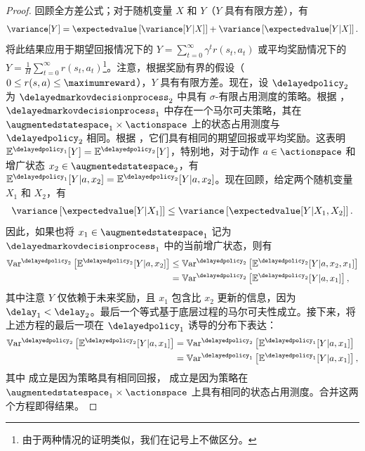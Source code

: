 \begin{proof}
    回顾全方差公式；对于随机变量 $X$ 和 $Y$（$Y$ 具有有限方差），有
    \begin{align*}
        \variance[Y] = \expectedvalue\left[\variance[Y\vert X]\right] + \variance\left[\expectedvalue[Y\vert X]\right].
    \end{align*}
    将此结果应用于期望回报情况下的 $\textstyle Y=\sum_{t=0}^\infty \gamma^{t} r(s_{t},a_{t})$ 或平均奖励情况下的 $\textstyle Y=\frac{1}{H}\sum_{t=0}^\infty r(s_{t},a_{t})$\footnote{由于两种情况的证明类似，我们在记号上不做区分。}。注意，根据奖励有界的假设（$0\le r(s,a)\le \maximumreward$），$Y$ 具有有限方差。现在，设 $\delayedpolicy_2$ 为 $\delayedmarkovdecisionprocess_{2}$ 中具有 $\sigma$-有限占用测度的策略。根据 ，$\delayedmarkovdecisionprocess_{1}$ 中存在一个马尔可夫策略，其在 $\augmentedstatespace_1\times\actionspace$ 上的状态占用测度与 $\delayedpolicy_2$ 相同。根据 \cite[Lemma~1]{laroche2022non}，它们具有相同的期望回报或平均奖励。这表明 $\mathbb{E}^{\delayedpolicy_1}[Y]=\mathbb{E}^{\delayedpolicy_2}[Y]$，特别地，对于动作 $a\in\actionspace$ 和增广状态 $x_2\in\augmentedstatespace_2$，有 $\mathbb{E}^{\delayedpolicy_1}[Y\vert a,x_2]=\mathbb{E}^{\delayedpolicy_2}[Y\vert a,x_2]$。现在回顾，给定两个随机变量 $X_1$ 和 $X_2$，有
    \begin{align*}
        \variance\left[\expectedvalue[Y\vert X_1]\right]\le \variance\left[\expectedvalue[Y\vert X_1,X_2]\right].
    \end{align*}
    因此，如果也将 $x_1\in\augmentedstatespace_1$ 记为 $\delayedmarkovdecisionprocess_1$ 中的当前增广状态，则有
    \begin{align*}
        \mathbb{V}\mathrm{ar}^{\delayedpolicy_2}\left[\mathbb{E}^{\delayedpolicy_2}[Y\vert a,x_2]\right] &\le \mathbb{V}\mathrm{ar}^{\delayedpolicy_2}\left[\mathbb{E}^{\delayedpolicy_2}[Y\vert a,x_2,x_1]\right]
        \\
        &=\mathbb{V}\mathrm{ar}^{\delayedpolicy_2}\left[\mathbb{E}^{\delayedpolicy_2}[Y\vert a,x_1]\right],
    \end{align*}
    其中注意 $Y$ 仅依赖于未来奖励，且 $x_1$ 包含比 $x_2$ 更新的信息，因为 $\delay_1<\delay_2$。最后一个等式基于底层过程的马尔可夫性成立。接下来，将上述方程的最后一项在 $\delayedpolicy_1$ 诱导的分布下表达：
    \begin{align}
        \mathbb{V}\mathrm{ar}^{\delayedpolicy_2}\left[\mathbb{E}^{\delayedpolicy_2}[Y\vert a,x_1]\right]
        &= \mathbb{V}\mathrm{ar}^{\delayedpolicy_2}\left[\mathbb{E}^{\delayedpolicy_1}[Y\vert a,x_1]\right]\label{eq:same_return_f}
        \\
        &= \mathbb{V}\mathrm{ar}^{\delayedpolicy_1}\left[\mathbb{E}^{\delayedpolicy_1}[Y\vert a,x_1]\right]\label{eq:same_distrib_f},
    \end{align}
    其中  成立是因为策略具有相同回报， 成立是因为策略在 $\augmentedstatespace_1\times\actionspace$ 上具有相同的状态占用测度。合并这两个方程即得结果。
\end{proof}

